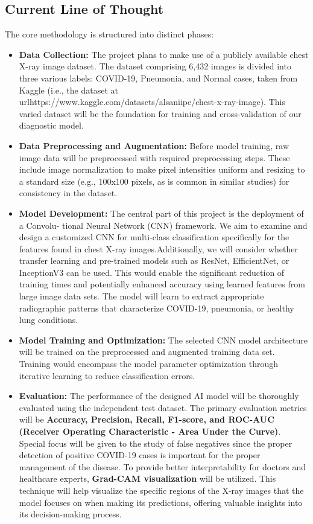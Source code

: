 \documentclass[10pt, a4paper]{article}
\begin{document}
\subsection*{Current Line of Thought}
The core methodology is structured into distinct phases:
\begin{itemize}
    \item \textbf{Data Collection:} The project plans to make use of a publicly available chest X-ray image dataset. The dataset comprising 6,432 images is divided into three various labels: COVID-19, Pneumonia, and Normal cases, taken from Kaggle (i.e., the dataset at urlhttps://www.kaggle.com/datasets/alsaniipe/chest-x-ray-image). This varied dataset will be the foundation for training and cross-validation of our diagnostic model. 

    \item \textbf{Data Preprocessing and Augmentation:} Before model training, raw image data will be preprocessed with required preprocessing steps. These include image normalization to make pixel intensities uniform and resizing to a standard size (e.g., 100x100 pixels, as is common in similar studies) for consistency in the dataset.
    
    \item \textbf{Model Development:} The central part of this project is the deployment of a Convolu- tional Neural Network (CNN) framework. We aim to examine and design a customized CNN for multi-class classification specifically for the features found in chest X-ray images.Additionally, we will consider whether transfer learning and pre-trained models such as ResNet, EfficientNet, or InceptionV3 can be used. This would enable the significant reduction of training times and potentially enhanced accuracy using learned features from large image data sets. The model will learn to extract appropriate radiographic patterns that characterize COVID-19, pneumonia, or healthy lung conditions.

    \item \textbf{Model Training and Optimization:} The selected CNN model architecture will be trained on the preprocessed and augmented training data set. Training would encompass the model parameter optimization through iterative learning to reduce classification errors.

    \item \textbf{Evaluation:} The performance of the designed AI model will be thoroughly evaluated using the independent test dataset. The primary evaluation metrics will be \textbf{Accuracy, Precision, Recall, F1-score, and ROC-AUC (Receiver Operating Characteristic - Area Under the Curve)}. Special focus will be given to the study of false negatives since the proper detection of positive COVID-19 cases is important for the proper management of the disease. To provide better interpretability for doctors and healthcare experts, \textbf{Grad-CAM visualization} will be utilized. This technique will help visualize the specific regions of the X-ray images that the model focuses on when making its predictions, offering valuable insights into its decision-making process.

\end{itemize}
\end{document}
